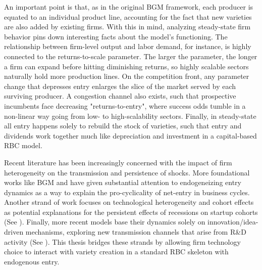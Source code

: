 \documentclass[a4paper,12pt]{article} %
\numberwithin{equation}{section} %
\numberwithin{figure}{section}
\numberwithin{table}{section}
\begin{document}
An important point is that, as in the original BGM framework, each producer is equated to an individual product line, accounting for the fact that new varieties
are also added by existing firms. With this in mind, analyzing steady-state firm behavior pins down interesting facts about the model's functioning. 
The relationship between firm-level output and labor demand, for instance, is highly connected to the returns-to-scale parameter. The larger the 
parameter, the longer a firm can expand before hitting diminishing returns, so highly scalable sectors naturally hold more production lines. On the 
competition front, any parameter change that depresses entry enlarges the slice of the market served by each surviving producer. A congestion channel also
exists, such that prospective incumbents face decreasing "returns-to-entry", where success odds tumble in a non-linear way going from low- to high-scalability sectors.
Finally, in steady-state all entry happens solely to rebuild the stock of varieties, such that entry and dividends work together much like depreciation and
investment in a capital-based RBC model.


Recent literature has been increasingly concerned with the impact of firm heterogeneity on the transmission and persistence of shocks. More foundational works 
like BGM and \textcite{ghironi2007trade} have given substantial attention to endogeneizing entry dynamics as a way to explain the pro-cyclicality of net-entry in 
business cycles.
Another strand of work focuses on technological heterogeneity and cohort effects as potential explanations for the persistent effects of recessions on startup cohorts
(See \cite{sedlavcek2017growth,clementi2016entry}). Finally, more recent models base their dynamics solely on innovation/idea-driven mechanisms, exploring
new transmission channels that arise from R\&D activity (See \cite{anzoategui2019endogenous,comin2006medium}). This thesis bridges these strands by allowing firm technology choice to interact with variety creation
in a standard RBC skeleton with endogenous entry.
\end{document}
